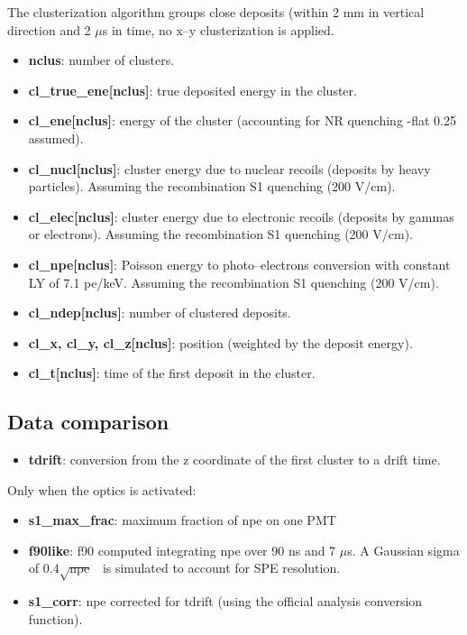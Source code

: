 \documentclass[twocolumn, 10pt]{article}
\begin{document}
The clusterization algorithm groups close deposits (within 2 mm in vertical direction and 2 $\mu$s in time, no x--y clusterization is applied.  
\begin{itemize}
\item {\bf{nclus}}:               number of clusters.
\item {\bf{cl\_true\_ene[nclus]}}: true deposited energy in the cluster.
\item {\bf{cl\_ene[nclus]}}:      energy of the cluster (accounting for NR quenching -flat  0.25 assumed).
\item {\bf{cl\_nucl[nclus]}}:     cluster energy due to nuclear recoils (deposits by heavy particles). Assuming the recombination S1 quenching (200 V/cm). 
\item {\bf{cl\_elec[nclus]}}:     cluster energy due to electronic recoils (deposits by gammas or electrons).  Assuming the recombination S1 quenching (200      V/cm).

\item {\bf{cl\_npe[nclus]}}:      Poisson energy to photo--electrons conversion with constant LY of 7.1 pe/keV.  Assuming the recombination S1 quenching (200      V/cm). 
\item {\bf{cl\_ndep[nclus]}}:     number of clustered deposits. 
\item {\bf{cl\_x, cl\_y, cl\_z[nclus]}}: position (weighted by the deposit energy).
\item {\bf{cl\_t[nclus]}}:      time of the first deposit in the cluster.
\end{itemize}

\subsection{Data comparison}
\begin{itemize}
\item {\bf{tdrift}}:  conversion from the z coordinate of the first cluster to a drift time. 

\end{itemize}
Only when the optics is activated: 
\begin{itemize}
\item {\bf{s1\_max\_frac}}: maximum fraction of npe on one PMT
\item {\bf{f90like}}: f90 computed integrating npe over 90 ns and 7 $\mu$s. A Gaussian sigma of $0.4\sqrt{\mbox{npe}}$~ is simulated to account for SPE resolution. 
\item {\bf{s1\_corr}}: npe corrected for tdrift (using the official analysis conversion function).  
\end{itemize}
\end{document}
